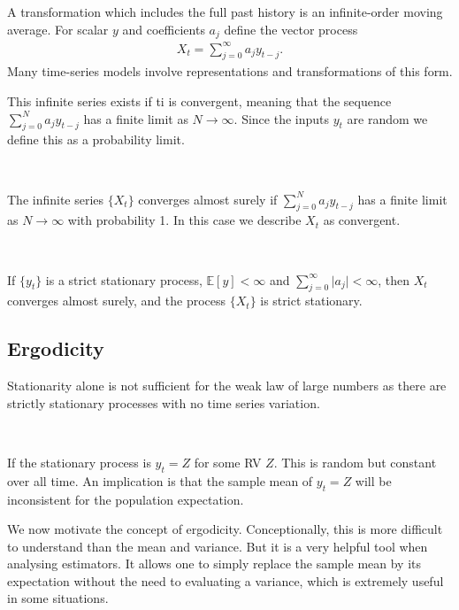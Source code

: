 A transformation which includes the full past history is an infinite-order moving average.
For scalar $y$ and coefficients $a_j$ define the vector process
\begin{gather*}
    X_t = \sum_{j=0}^{\infty} a_j y_{t-j}.
\end{gather*}
Many time-series models involve representations and transformations of this form.

This infinite series exists if ti is convergent, meaning that the sequence $\sum_{j=0}^{N}a_j y_{t-j}$
has a finite limit as $N \to \infty$.  Since the inputs $y_t$ are random we define this as a probability limit.

\begin{definition}[Convergence]\label{def:convergence}
    \

    The infinite series $\{X_t\}$ converges almost surely if $\sum_{j=0}^{N} a_j y_{t-j}$
    has a finite limit as $N \to \infty$ with probability 1.
    In this case we describe $X_t$ as convergent.
    
\end{definition}
\begin{theorem}\label{thm:convergence-stationary}
    \

    If $\{y_t\}$ is a strict stationary process, $\mathbb{E}[y] < \infty$ 
    and $\sum_{j=0}^{\infty} \vert a_j \vert < \infty$,
    then $X_t$ converges almost surely,
    and the process $\{X_t\}$ is strict stationary.  
\end{theorem}

\subsection{Ergodicity}
\label{sec:ergodicity}

Stationarity alone is not sufficient for the weak law of large numbers as there are strictly stationary
processes with no time series variation.

\begin{eg}
    \
    
    If the stationary process is $y_t = Z$ for some RV $Z$.
    This is random but constant over all time. 
    An implication is that the sample mean of $y_t = Z$ will be inconsistent for the population expectation.
\end{eg}

We now motivate the concept of ergodicity. Conceptionally, this is more difficult to understand
than the mean and variance. But it is a very helpful tool when analysing estimators. It allows one
to simply replace the sample mean by its expectation without the need to evaluating a variance,
which is extremely useful in some situations.

